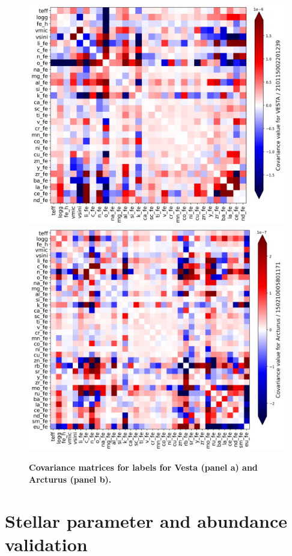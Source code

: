 \documentclass[
  journal=pasa,
  manuscript=research-paper, %
  year=2024,
  volume=37
]{cup-journal}
\begin{document}
\begin{figure}[ht]
 \centering
 \includegraphics[width=\textwidth]{figures/covariance_vesta.png}
 \hfill
 \includegraphics[width=\textwidth]{figures/covariance_arcturus.png}
 \caption{\textbf{Covariance matrices for labels for Vesta (panel a) and Arcturus (panel b).}}
 \label{fig:covariance_vesta_arcturus}
\end{figure}

\section{Stellar parameter and abundance validation}
\end{document}
